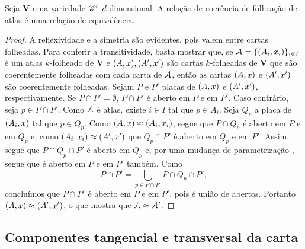 \begin{proposition}
Seja $\bm V$ uma variedade $\mathscr{C}^r$ $d$-dimensional. A relação de coerência de folheação de atlas é uma relação de equivalência.
\end{proposition}
\begin{proof}
A reflexividade e a simetria são evidentes, pois valem entre cartas folheadas. Para conferir a transitividade, basta mostrar que, se $\mathcal{A} = \{(A_i,x_i)\}_{i \in I}$ é um atlas $k$-folheado de $\bm V$ e $(A,x), (A',x')$ são cartas $k$-folheadas de $\bm V$ que são coerentemente folheadas com cada carta de $\mathcal{A}$, então as cartas $(A,x)$ e $(A',x')$ são coerentemente folheadas. Sejam $P$ e $P'$ placas de $(A,x)$ e $(A',x')$, respectivamente. Se $P \cap P' = \emptyset$, $P \cap P'$ é aberto em $P$ e em $P'$. Caso contrário, seja $p \in P \cap P'$. Como $\mathcal{A}$ é atlas, existe $i \in I$ tal que $p \in A_i$. Seja $Q_p$ a placa de $(A_i,x)$ tal que $p \in Q_p$. Como $(A,x) \approx (A_i,x_i)$, segue que $P \cap Q_p$ é aberto em $P$ e em $Q_p$ e, como $(A_i,x_i) \approx (A',x')$ que $Q_p \cap P'$ é aberto em $Q_p$ e em $P'$. Assim, segue que $P \cap Q_p \cap P'$ é aberto em $Q_p$ e, por uma mudança de parametrização%
, segue que é aberto em $P$ e em $P'$ também. Como
	\begin{equation*}
	P \cap P' = \bigcup_{p \in P \cap P'} P \cap Q_p \cap P',
	\end{equation*}
concluímos que $P \cap P'$ é aberto em $P$ e em $P'$, pois é união de abertos. Portanto $(A,x) \approx (A',x')$, o que mostra que $\mathcal{A} \approx \mathcal{A}'$.
\end{proof}

\subsection{Componentes tangencial e transversal da carta}

